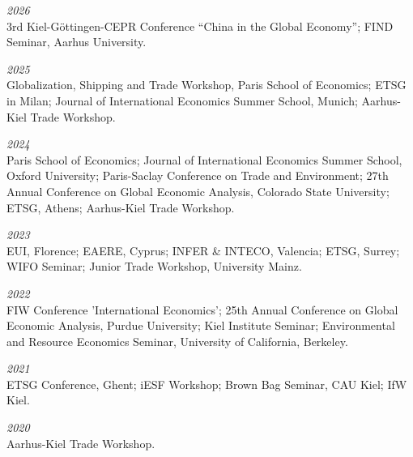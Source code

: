 \documentclass{article}
\newlength{\cvlabelwidth}\setlength{\cvlabelwidth}{0.12\textwidth}
\newlength{\cvlabelgap}\setlength{\cvlabelgap}{5mm}
\newcommand{\cvmakelabel}[1]{%
    \smash{\parbox[t]{\cvlabelwidth}{\raggedright{\fontfamily{phv}\selectfont #1}}}}
\newenvironment{cvsection}[1]{%
    \par\medskip
    \begin{list}{}{%
        \setlength{\leftmargin}{\dimexpr\cvlabelwidth+\cvlabelgap\relax}%
        \setlength{\labelwidth}{\cvlabelwidth}%
        \setlength{\labelsep}{\cvlabelgap}%
        \setlength{\rightmargin}{0pt}%
        \setlength{\itemindent}{0pt}%
        \setlength{\listparindent}{0pt}%
        \setlength{\topsep}{0pt}%
        \setlength{\partopsep}{0pt}%
        \setlength{\parsep}{0.3em}%
        \setlength{\itemsep}{0pt}%
        \let\makelabel\cvmakelabel%
    }%
    \item[#1]\ignorespaces%
}{%
    \end{list}\medskip%
}
\begin{document}

\begin{cvsection}{CONFERENCES \& SEMINARS}
    \textit{2026} \\
    3rd Kiel-Göttingen-CEPR Conference ``China in the Global Economy''; FIND Seminar, Aarhus University. \par
    \textit{2025} \\
    Globalization, Shipping and Trade Workshop, Paris School of Economics; ETSG in Milan; Journal of International Economics Summer School, Munich; Aarhus-Kiel Trade Workshop. \par
    \textit{2024} \\
    Paris School of Economics; Journal of International Economics Summer School, Oxford University; Paris-Saclay Conference on Trade and Environment; 27th Annual Conference on Global Economic Analysis, Colorado State University; ETSG, Athens; Aarhus-Kiel Trade Workshop. \par
    \textit{2023} \\
    EUI, Florence; EAERE, Cyprus; INFER \& INTECO, Valencia; ETSG, Surrey; WIFO Seminar; Junior Trade Workshop, University Mainz. \par

    \textit{2022} \\
    FIW Conference 'International Economics'; 25th Annual Conference on Global Economic Analysis, Purdue University; Kiel Institute Seminar; Environmental and Resource Economics Seminar, University of California, Berkeley.  \par
    \textit{2021} \\
    ETSG Conference, Ghent; iESF Workshop; Brown Bag Seminar, CAU Kiel; IfW Kiel. \par
    \textit{2020} \\
    Aarhus-Kiel Trade Workshop. \par
\end{cvsection}

\end{document}
